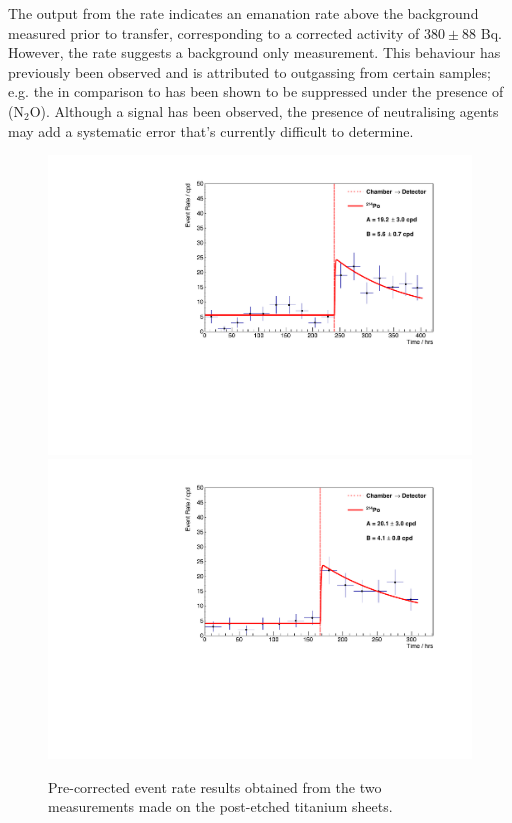 The output from the \PoTOF{} rate indicates an emanation rate above the background measured prior to transfer, corresponding to a corrected activity of $380\pm88$ \micro{}Bq. However, the \PoTOE{} rate suggests a background only measurement. This behaviour has previously been observed and is attributed to outgassing from certain samples; e.g. the \PoTOE{} in comparison to \PoTOF{} has been shown to be suppressed under the presence of (N$_{2}$O). Although a signal has been observed, the presence of neutralising agents may add a systematic error that's currently difficult to determine. 
%
\begin{figure}[t!]
    \centering
    \includegraphics[scale=0.42]{Chapter_4/Figures/ucl_measurements/titanium_sheets_post_etching_1_Po214.pdf}
    \includegraphics[scale=0.42]{Chapter_4/Figures/ucl_measurements/titanium_sheets_post_etching_2_Po214.pdf}    
    \caption[Pre-corrected \PoTOF{} and \PoTOE{} event rate results obtained from the single measurement made on the pre-etched titanium sheets.]
    {Pre-corrected \PoTOF{} event rate results obtained from the two measurements made on the post-etched titanium sheets.}
    \label{fig:ti_post_etched_sheets_results}
\end{figure}
%

